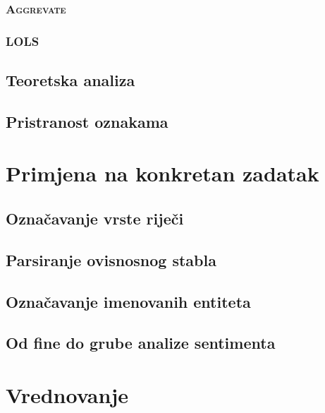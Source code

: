\documentclass[times, utf8, diplomski]{fer}
\begin{document}
\subsection{\textsc{Aggrevate}}

\subsection{\textsc{LOLS}}\label{ch:LOLS}


\section{Teoretska analiza}
\section{Pristranost oznakama}\label{ch:labelbias}


\chapter{Primjena na konkretan zadatak}

\section{Označavanje vrste riječi}


\section{Parsiranje ovisnosnog stabla}


\section{Označavanje imenovanih entiteta}

\section{Od fine do grube analize sentimenta}

\chapter{Vrednovanje}
\end{document}
